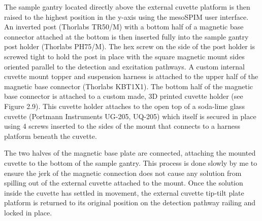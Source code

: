 The sample gantry located directly above the external cuvette platform is then raised to the highest position in the y-axis using the mesoSPIM user interface. An inverted post (Thorlabs TR50/M) with a bottom half of a magnetic base connector attached at the bottom is then inserted fully into the sample gantry post holder (Thorlabs PH75/M). The hex screw on the side of the post holder is screwed tight to hold the post in place with the square magnetic mount sides oriented parallel to the detection and excitation pathways. A custom internal cuvette mount topper and suspension harness is attached to the upper half of the magnetic base connector (Thorlabs KBT1X1). The bottom half of the magnetic base connector is attached to a custom made, 3D printed cuvette holder (see Figure 2.9). This cuvette holder attaches to the open top of a soda-lime glass cuvette (Portmann Instruments UG-205, UQ-205) which itself is secured in place using 4 screws inserted to the sides of the mount that connects to a harness platform beneath the cuvette. 

The two halves of the magnetic base plate are connected, attaching the mounted cuvette to the bottom of the sample gantry. This process is done slowly by me to ensure the jerk of the magnetic connection does not cause any solution from spilling out of the external cuvette attached to the mount. Once the solution inside the cuvette has settled in movement, the external cuvette tip-tilt plate platform is returned to its original position on the detection pathway railing and locked in place. 

